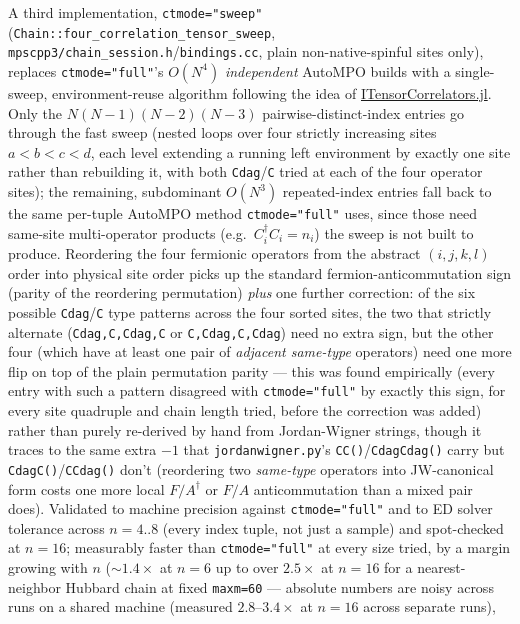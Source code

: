 \documentclass[11pt]{article}
\begin{document}
A third implementation, \texttt{ctmode="sweep"}
(\texttt{Chain::four\_correlation\_tensor\_sweep},
\texttt{mpscpp3/chain\_session.h}/\texttt{bindings.cc}, plain
non-native-spinful sites only), replaces \texttt{ctmode="full"}'s
$O(N^4)$ \emph{independent} AutoMPO builds with a single-sweep,
environment-reuse algorithm following the idea of
\href{https://github.com/ITensor/ITensorCorrelators.jl}{ITensorCorrelators.jl}.
Only the $N(N-1)(N-2)(N-3)$ pairwise-distinct-index entries go through
the fast sweep (nested loops over four strictly increasing sites
$a<b<c<d$, each level extending a running left environment by exactly
one site rather than rebuilding it, with both \texttt{Cdag}/\texttt{C}
tried at each of the four operator sites); the remaining, subdominant
$O(N^3)$ repeated-index entries fall back to the same per-tuple AutoMPO
method \texttt{ctmode="full"} uses, since those need same-site
multi-operator products (e.g.\ $C^\dagger_i C_i = n_i$) the sweep is not
built to produce. Reordering the four fermionic operators from the
abstract $(i,j,k,l)$ order into physical site order picks up the
standard fermion-anticommutation sign (parity of the reordering
permutation) \emph{plus} one further correction: of the six possible
\texttt{Cdag}/\texttt{C} type patterns across the four sorted sites, the
two that strictly alternate (\texttt{Cdag,C,Cdag,C} or
\texttt{C,Cdag,C,Cdag}) need no extra sign, but the other four (which
have at least one pair of \emph{adjacent same-type} operators) need one
more flip on top of the plain permutation parity --- this was found
empirically (every entry with such a pattern disagreed with
\texttt{ctmode="full"} by exactly this sign, for every site quadruple
and chain length tried, before the correction was added) rather than
purely re-derived by hand from Jordan-Wigner strings, though it traces
to the same extra $-1$ that \texttt{jordanwigner.py}'s
\texttt{CC()}/\texttt{CdagCdag()} carry but
\texttt{CdagC()}/\texttt{CCdag()} don't (reordering two \emph{same-type}
operators into JW-canonical form costs one more local $F/A^\dagger$ or
$F/A$ anticommutation than a mixed pair does). Validated to machine
precision against \texttt{ctmode="full"} and to ED solver tolerance
across $n=4..8$ (every index tuple, not just a sample) and spot-checked
at $n=16$; measurably faster than \texttt{ctmode="full"} at every size
tried, by a margin growing with $n$ ($\sim1.4\times$ at $n=6$ up to over
$2.5\times$ at $n=16$ for a nearest-neighbor Hubbard chain at fixed
\texttt{maxm=60} --- absolute numbers are noisy across runs on a shared
machine (measured $2.8$--$3.4\times$ at $n=16$ across separate runs),
\end{document}

